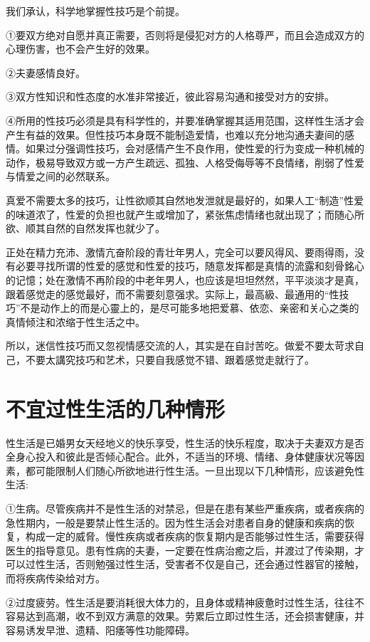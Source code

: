 \documentclass[12pt,UTF8]{ctexbook}
\begin{document}
我们承认，科学地掌握性技巧是个前提。

①要双方绝对自愿并真正需要，否则将是侵犯对方的人格尊严，而且会造成双方的心理伤害，也不会产生好的效果。

②夫妻感情良好。

③双方性知识和性态度的水准非常接近，彼此容易沟通和接受对方的安排。

④所用的性技巧必须是具有科学性的，并要准确掌握其适用范围，这样性生活才会产生有益的效果。但性技巧本身既不能制造爱情，也难以充分地沟通夫妻间的感情。如果过分强调性技巧，会对感情产生不良作用，使性爱的行为变成一种机械的动作，极易导致双方或一方产生疏远、孤独、人格受侮辱等不良情绪，削弱了性爱与情爱之间的必然联系。

真爱不需要太多的技巧，让性欲顺其自然地发泄就是最好的，如果人工“制造”性爱的味道浓了，性爱的负担也就产生或增加了，紧张焦虑情绪也就出现了；而随心所欲、顺其自然的自然发挥也就少了。

正处在精力充沛、激情亢奋阶段的青壮年男人，完全可以要风得风、要雨得雨，没有必要寻找所谓的性爱的感觉和性爱的技巧，随意发挥都是真情的流露和刻骨銘心的记憶；处在激情不再阶段的中老年男人，也应该是坦坦然然，平平淡淡才是真，跟着感觉走的感觉最好，而不需要刻意强求。实际上，最高級、最通用的“性技巧”不是动作上的而是心靈上的，是尽可能多地把爱慕、依恋、亲密和关心之类的真情倾注和浓缩于性生活之中。

所以，迷信性技巧而又忽视情感交流的人，其实是在自討苦吃。做爱不要太苛求自己，不要太講究技巧和艺术，只要自我感觉不错、跟着感觉走就行了。

\section{不宜过性生活的几种情形}


性生活是已婚男女天经地义的快乐享受，性生活的快乐程度，取决于夫妻双方是否全身心投入和彼此是否倾心配合。此外，不适当的环境、情绪、身体健康状况等因素，都可能限制人们随心所欲地进行性生活。一旦出现以下几种情形，应该避免性生活:

①生病。尽管疾病并不是性生活的对禁忌，但是在患有某些严重疾病，或者疾病的急性期内，一般是要禁止性生活的。因为性生活会对患者自身的健康和疾病的恢复，构成一定的威脅。慢性疾病或者疾病的恢复期内是否能够过性生活，需要获得医生的指导意见。患有性病的夫妻，一定要在性病治癒之后，并渡过了传染期，才可以过性生活，否则勉强过性生活，受害者不仅是自己，还会通过性器官的接触，而将疾病传染给对方。

②过度疲劳。性生活是要消耗很大体力的，且身体或精神疲惫时过性生活，往往不容易达到高潮，收不到双方满意的效果。劳累后立即过性生活，还会损害健康，并容易诱发早泄、遗精、阳痿等性功能障碍。
\end{document}
